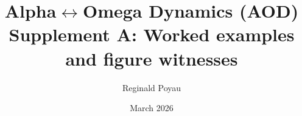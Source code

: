 \title{Alpha$\leftrightarrow$Omega Dynamics (AOD)\\
\large Supplement A: Worked examples and figure witnesses}
\author{Reginald Poyau}
\date{March 2026}
\maketitle

